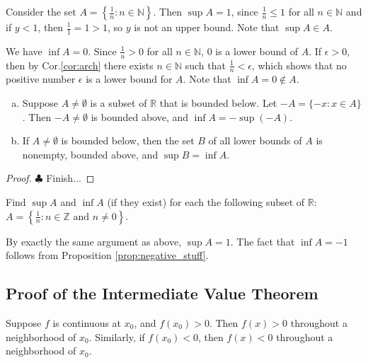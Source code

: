 \documentclass[12pt,letterpaper,reqno]{article}
\numberwithin{equation}{section}
\newcommand{\R}{\ensuremath{\mathbb R}}
\newcommand{\Z}{\ensuremath{\mathbb Z}}
\newcommand{\N}{{\mathbb N}}
\newcommand{\fixme}[1]{{\color{orange}{[#1]}}}
\begin{document}
{\begin{example}
Consider the set $A=\left\{\frac{1}{n}:n \in \N\right\}$. Then $\sup A=1$, since $\frac{1}{n}\leq 1$ for all $n \in \N$ and if $y<1$, then $\frac{1}{1}=1>1$, so $y$ is not an upper bound. Note that $\sup A \in A$.

	We have $\inf A=0$. Since $\frac{1}{n}>0$ for all $n \in \N$, $0$ is a lower bound of $A$. If $\epsilon>0$, then by Cor.\ref{cor:arch} there exists $n \in \N$ such that $\frac{1}{n}<\epsilon$, which shows that no positive number $\epsilon$ is a lower bound for $A$. Note that $\inf A=0 \notin A$.
\end{example}

\begin{prop}\label{prop:negative_stuff}
\begin{enumerate}[(a)]
	\item Suppose $A \neq \emptyset$ is a subset of $\R$ that is bounded below. Let $-A=\{-x:x \in A\}$. Then $-A \neq \emptyset$ is bounded above, and $\inf A=-\sup(-A)$.
	\item If $A \neq \emptyset$ is bounded below, then the set $B$ of all lower bounds of $A$ is nonempty, bounded above, and $\sup B=\inf A$.
\end{enumerate}	
\end{prop}

\begin{proof}
	$\clubsuit$ Finish...
\end{proof}

\begin{exercise}
Find $\sup A$ and $\inf A$ (if they exist) for each the following subset of $\R$:
$A=\left\{\frac{1}{n}:n \in \Z \text{ and } n \neq 0\right\}$.
\end{exercise}

{\color{red}
\begin{solution}
	By exactly the same argument as above, $\sup A=1$.
	The fact that $\inf A=-1$ follows from Proposition \ref{prop:negative_stuff}. \fixme{Finish.}
\end{solution}
}

\subsection{Proof of the Intermediate Value Theorem}
\begin{lem}
Suppose $f$ is continuous at $x_0$, and $f(x_0)>0$. Then $f(x)>0$ throughout a neighborhood of $x_0$. Similarly, if $f(x_0)<0$, then $f(x)<0$ throughout a neighborhood of $x_0$.	
\end{lem}

}
\end{document}
